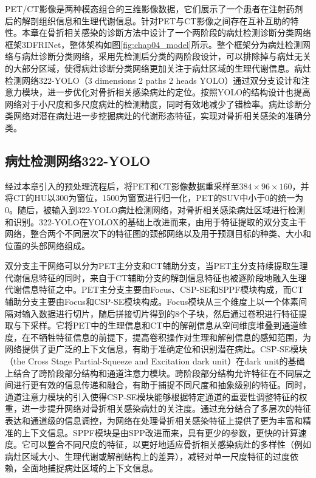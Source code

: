 PET/CT影像是两种模态组合的三维影像数据，它们展示了一个患者在注射药剂后的解剖组织信息和生理代谢信息。针对PET与CT影像之间存在互补互助的特性。本章在骨折相关感染的诊断方法中设计了一个两阶段的病灶检测诊断分类网络框架3DFRINet，整体架构如图\ref{fig:chap04_model}所示。整个框架分为病灶检测网络与病灶诊断分类网络，采用先检测后分类的两阶段设计，可以排除掉与病灶无关的大部分区域，使得病灶诊断分类网络更加关注于病灶区域的生理代谢信息。病灶检测网络322-YOLO（3 dimensions 2 paths 2 heads YOLO）通过双分支设计和注意力模块，进一步优化对骨折相关感染病灶的定位。按照YOLO的结构设计也提高网络对于小尺度和多尺度病灶的检测精度，同时有效地减少了错检率。病灶诊断分类网络对潜在病灶进一步挖掘病灶的代谢形态特征，实现对骨折相关感染的准确分类。

\subsection{病灶检测网络322-YOLO}

经过本章引入的预处理流程后，将PET和CT影像数据重采样至\(384 \times 96\times 160\)，并将CT的HU以300为窗位，1500为窗宽进行归一化，PET的SUV中小于0的统一为0。随后，被输入到322-YOLO病灶检测网络，对骨折相关感染病灶区域进行检测和识别。322-YOLO在YOLOX\cite{ge2021yolox}的基础上改进而来，由用于特征提取的双分支主干网络，整合两个不同层次下的特征图的颈部网络以及用于预测目标的种类、大小和位置的头部网络组成。

双分支主干网络可以分为PET主分支和CT辅助分支，当PET主分支持续提取生理代谢信息特征的同时，来自于CT辅助分支的解剖信息特征也被逐阶段地融入生理代谢信息特征之中。PET主分支主要由Focus、CSP-SE和SPPF模块构成，而CT辅助分支主要由Focus和CSP-SE模块构成。Focus模块从三个维度上以一个体素间隔对输入数据进行切片，随后拼接切片得到的8个子块，然后通过卷积进行特征提取与下采样。它将PET中的生理信息和CT中的解剖信息从空间维度堆叠到通道维度，在不牺牲特征信息的前提下，提高卷积操作对生理和解剖信息的感知范围，为网络提供了更广泛的上下文信息，有助于准确定位和识别潜在病灶。CSP-SE模块（the Cross Stage Partial-Squeeze and Excitation dark unit）在dark unit的基础上结合了跨阶段部分结构\cite{wang2020cspnet}和通道注意力模块\cite{hu2018squeeze}。跨阶段部分结构允许特征在不同层之间进行更有效的信息传递和融合，有助于捕捉不同尺度和抽象级别的特征。同时，通道注意力模块的引入使得CSP-SE模块能够根据特定通道的重要性调整特征的权重，进一步提升网络对骨折相关感染病灶的关注度。通过充分结合了多层次的特征表达和通道级的信息调控，为网络在处理骨折相关感染特征上提供了更为丰富和精准的上下文信息。SPPF模块是由SPP\cite{he2015spatial}改进而来，具有更少的参数，更快的计算速度。它可以整合不同尺度的特征，以更好地适应骨折相关感染病灶的多样性（例如病灶区域大小、生理代谢或解剖结构上的差异），减轻对单一尺度特征的过度依赖，全面地捕捉病灶区域的上下文信息。

